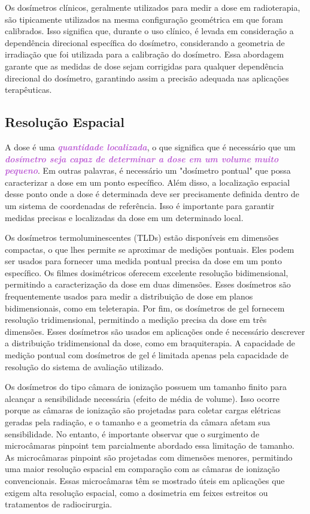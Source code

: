 \documentclass[11pt,a4paper]{article}
\begin{document}
	Os dosímetros clínicos, geralmente utilizados para medir a dose em radioterapia, são tipicamente utilizados na mesma configuração geométrica em que foram calibrados. Isso significa que, durante o uso clínico, é levada em consideração a dependência direcional específica do dosímetro, considerando a geometria de irradiação que foi utilizada para a calibração do dosímetro. Essa abordagem garante que as medidas de dose sejam corrigidas para qualquer dependência direcional do dosímetro, garantindo assim a precisão adequada nas aplicações terapêuticas.

\subsection*{Resolução Espacial}


	A dose é uma \textcolor{MediumOrchid}{\textit{\textbf{quantidade localizada}}}, o que significa que é necessário que um \textcolor{MediumOrchid}{\textit{\textbf{dosímetro seja capaz de determinar a dose em um volume muito pequeno}}}. Em outras palavras, é necessário um "dosímetro pontual" que possa caracterizar a dose em um ponto específico. Além disso, a localização espacial desse ponto onde a dose é determinada deve ser precisamente definida dentro de um sistema de coordenadas de referência. Isso é importante para garantir medidas precisas e localizadas da dose em um determinado local.

	Os dosímetros termoluminescentes (TLDs) estão disponíveis em dimensões compactas, o que lhes permite se aproximar de medições pontuais. Eles podem ser usados para fornecer uma medida pontual precisa da dose em um ponto específico. Os filmes dosimétricos oferecem excelente resolução bidimensional, permitindo a caracterização da dose em duas dimensões. Esses dosímetros são frequentemente usados para medir a distribuição de dose em planos bidimensionais, como em teleterapia. Por fim, os dosímetros de gel fornecem resolução tridimensional, permitindo a medição precisa da dose em três dimensões. Esses dosímetros são usados em aplicações onde é necessário descrever a distribuição tridimensional da dose, como em braquiterapia. A capacidade de medição pontual com dosímetros de gel é limitada apenas pela capacidade de resolução do sistema de avaliação utilizado.

	Os dosímetros do tipo câmara de ionização possuem um tamanho finito para alcançar a sensibilidade necessária (efeito de média de volume). Isso ocorre porque as câmaras de ionização são projetadas para coletar cargas elétricas geradas pela radiação, e o tamanho e a geometria da câmara afetam sua sensibilidade. No entanto, é importante observar que o surgimento de microcâmaras pinpoint tem parcialmente abordado essa limitação de tamanho. As microcâmaras pinpoint são projetadas com dimensões menores, permitindo uma maior resolução espacial em comparação com as câmaras de ionização convencionais. Essas microcâmaras têm se mostrado úteis em aplicações que exigem alta resolução espacial, como a dosimetria em feixes estreitos ou tratamentos de radiocirurgia.
\end{document}
